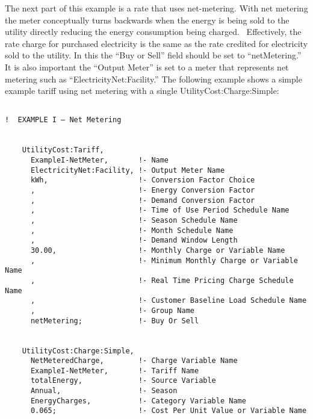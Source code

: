 The next part of this example is a rate that uses net-metering. With net metering the meter conceptually turns backwards when the energy is being sold to the utility directly reducing the energy consumption being charged.~ Effectively, the rate charge for purchased electricity is the same as the rate credited for electricity sold to the utility. In this the ``Buy or Sell'' field should be set to ``netMetering.''~ It is also important the ``Output Meter'' is set to a meter that represents net metering such as ``ElectricityNet:Facility.'' The following example shows a simple example tariff using net metering with a single UtilityCost:Charge:Simple:

\begin{lstlisting}

!  EXAMPLE I – Net Metering


    UtilityCost:Tariff,
      ExampleI-NetMeter,       !- Name
      ElectricityNet:Facility, !- Output Meter Name
      kWh,                     !- Conversion Factor Choice
      ,                        !- Energy Conversion Factor
      ,                        !- Demand Conversion Factor
      ,                        !- Time of Use Period Schedule Name
      ,                        !- Season Schedule Name
      ,                        !- Month Schedule Name
      ,                        !- Demand Window Length
      30.00,                   !- Monthly Charge or Variable Name
      ,                        !- Minimum Monthly Charge or Variable Name
      ,                        !- Real Time Pricing Charge Schedule Name
      ,                        !- Customer Baseline Load Schedule Name
      ,                        !- Group Name
      netMetering;             !- Buy Or Sell


    UtilityCost:Charge:Simple,
      NetMeteredCharge,        !- Charge Variable Name
      ExampleI-NetMeter,       !- Tariff Name
      totalEnergy,             !- Source Variable
      Annual,                  !- Season
      EnergyCharges,           !- Category Variable Name
      0.065;                   !- Cost Per Unit Value or Variable Name
\end{lstlisting}
